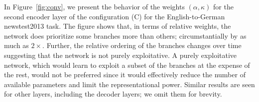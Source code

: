 \documentclass{article} %
\begin{document}







In Figure~\ref{fig:conv}, we present the behavior of the weights $(\alpha,\kappa)$ for the second encoder layer of the configuration (C) for the English-to-German newstest2013 task. The figure shows that, in terms of relative weights, the network does prioritize some branches more than others; circumstantially by as much as $2\times$. Further, the relative ordering of the branches changes over time suggesting that the network is not purely exploitative. A purely exploitative network, which would learn to exploit a subset of the branches at the expense of the rest, would not be preferred since it would effectively reduce the number of available parameters and limit the representational power. Similar results are seen for other layers, including the decoder layers; we omit them for brevity. 
\end{document}
